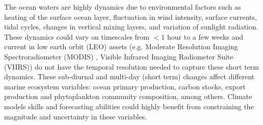 \documentclass[onecolumn,3p,letterpaper,11pt]{elsarticle}
\begin{document}


The ocean waters are highly dynamics due to environmental factors such as heating of the surface ocean layer, fluctuation in wind intensity, surface currents, tidal cycles, changes in vertical mixing layers, and variation of sunlight radiation.
These dynamics could vary on timescales from $< 1$ hour to a few weeks and current in low earth orbit (LEO) assets (e.g. Moderate Resolution Imaging Spectroradiometer (MODIS) \citep{Esaias1998}, Visible Infrared Imaging Radiometer Suite (VIIRS)) do not have the temporal resolution needed to capture these short term dynamics.
These sub-diurnal and multi-day (short term) changes affect different marine ecosystem variables: ocean primary production, carbon stocks, export production and phytoplankton community composition, among others.
Climate models skills and forecasting abilities could highly benefit from constraining the magnitude and uncertainty in these variables. 


\end{document}
